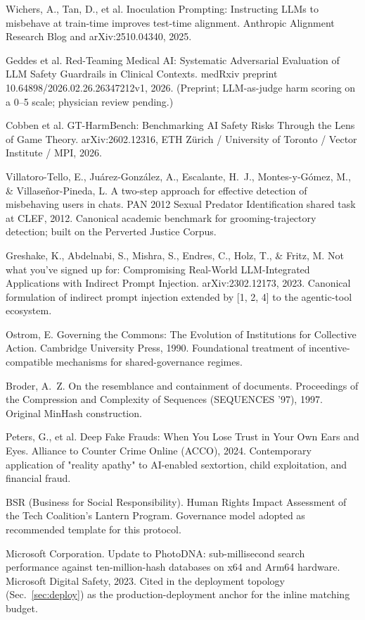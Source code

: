 \documentclass[11pt]{article}
\begin{document}
\begin{enumerate}[label={[\arabic*]}, leftmargin=2.4em, itemsep=2pt]
\item[{[9]}] Wichers, A., Tan, D., et al. Inoculation Prompting: Instructing LLMs to misbehave at train-time improves test-time alignment. Anthropic Alignment Research Blog and arXiv:2510.04340, 2025.
\item[{[10]}] Geddes et al. Red-Teaming Medical AI: Systematic Adversarial Evaluation of LLM Safety Guardrails in Clinical Contexts. medRxiv preprint 10.64898/2026.02.26.26347212v1, 2026. (Preprint; LLM-as-judge harm scoring on a 0--5 scale; physician review pending.)
\item[{[11]}] Cobben et al. GT-HarmBench: Benchmarking AI Safety Risks Through the Lens of Game Theory. arXiv:2602.12316, ETH Z\"urich / University of Toronto / Vector Institute / MPI, 2026.
\item[{[12]}] Villatoro-Tello, E., Ju\'arez-Gonz\'alez, A., Escalante, H.~J., Montes-y-G\'omez, M., \& Villase\~nor-Pineda, L. A two-step approach for effective detection of misbehaving users in chats. PAN 2012 Sexual Predator Identification shared task at CLEF, 2012. Canonical academic benchmark for grooming-trajectory detection; built on the Perverted Justice Corpus.
\item[{[13]}] Greshake, K., Abdelnabi, S., Mishra, S., Endres, C., Holz, T., \& Fritz, M. Not what you've signed up for: Compromising Real-World LLM-Integrated Applications with Indirect Prompt Injection. arXiv:2302.12173, 2023. Canonical formulation of indirect prompt injection extended by [1, 2, 4] to the agentic-tool ecosystem.
\item[{[14]}] Ostrom, E. Governing the Commons: The Evolution of Institutions for Collective Action. Cambridge University Press, 1990. Foundational treatment of incentive-compatible mechanisms for shared-governance regimes.
\item[{[15]}] Broder, A.~Z. On the resemblance and containment of documents. Proceedings of the Compression and Complexity of Sequences (SEQUENCES '97), 1997. Original MinHash construction.
\item[{[16]}] Peters, G., et al. Deep Fake Frauds: When You Lose Trust in Your Own Ears and Eyes. Alliance to Counter Crime Online (ACCO), 2024. Contemporary application of "reality apathy" to AI-enabled sextortion, child exploitation, and financial fraud.
\item[{[17]}] BSR (Business for Social Responsibility). Human Rights Impact Assessment of the Tech Coalition's Lantern Program. Governance model adopted as recommended template for this protocol.
\item[{[18]}] Microsoft Corporation. Update to PhotoDNA: sub-millisecond search performance against ten-million-hash databases on x64 and Arm64 hardware. Microsoft Digital Safety, 2023. Cited in the deployment topology (Sec.~\ref{sec:deploy}) as the production-deployment anchor for the inline matching budget.
\end{enumerate}
\end{document}
